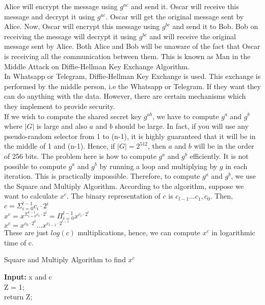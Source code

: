 \documentclass[11pt]{article}
\begin{document}
Alice will encrypt the message using $g^{ac}$ and send it. Oscar will receive this message and decrypt it using $g^{ac}$. Oscar will get the original message sent by Alice. Now, Oscar will encrypt this message using $g^{bc}$ and send it to Bob. Bob on receiving the message will decrypt it using $g^{bc}$ and will receive the original message sent by Alice. Both Alice and Bob will be unaware of the fact that Oscar is receiving all the communication between them. This is known as Man in the Middle Attack on Diffie-Hellman Key Exchange Algorithm.\\
\newline
In Whatsapp or Telegram, Diffie-Hellman Key Exchange is used. This exchange is performed by the middle person, i.e the Whatsapp or Telegram. If they want they can do anything with the data. However, there are certain mechanisms which they implement to provide security.\\
\newline
If we wish to compute the shared secret key $g^{ab}$, we have to compute $g^a$ and $g^b$ where $|G|$ is large and also $a$ and $b$ should be large. In fact, if you will use any pseudo-random selector from 1 to (n-1), it is highly guaranteed that it will be in the middle of 1 and (n-1). Hence, if $|G| = 2^{512}$, then $a$ and $b$ will be in the order of 256 bits. The problem here is how to compute $g^a$ and $g^b$ efficiently. It is not possible to compute $g^a$ and $g^b$ by running a loop and multiplying by $g$ in each iteration. This is practically impossible. Therefore, to compute $g^a$ and $g^b$, we use the Square and Multiply Algorithm. According to the algorithm, suppose we want to calculate $x^c$. The binary representation of $c$ is $c_{l-1}\hdots c_1, c_0$. Then, \\
 \vspace{3mm}
$c = \Sigma_{i = 0}^{l-1} c_i \cdot 2^i$\\
\vspace{3mm}
$x^c = x^{\Sigma_{i = 0}^{l-1} c_i \cdot 2^i} = \Pi_{i = 0}^{l-1} x^{c_i \cdot 2^i}$\\
\vspace{3mm}
$x^c = x^{c_0\cdot 2^0}\hdots x^{c_{l-1}\cdot 2^{l-1}}$\\
These are just $log(c)$ multiplications, hence, we can compute $x^c$ in logarithmic time of c.
\begin{center}
    \begin{algorithm}
    \caption{Square and Multiply Algorithm to find $x^c$}
        \textbf{Input:} x and c\\
        Z = 1;\\
        return Z;
    \end{algorithm}
\end{center}
\end{document}
